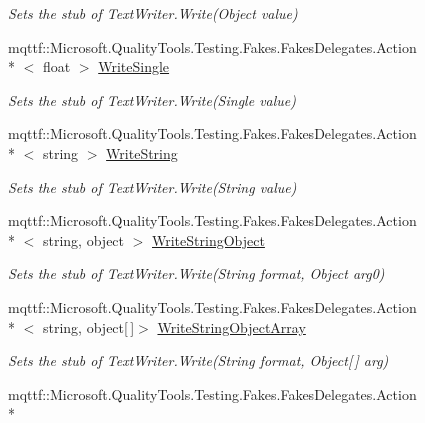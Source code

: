 \begin{DoxyCompactItemize}
\begin{DoxyCompactList}\small\item\em Sets the stub of Text\-Writer.\-Write(\-Object value)\end{DoxyCompactList}\item 
mqttf\-::\-Microsoft.\-Quality\-Tools.\-Testing.\-Fakes.\-Fakes\-Delegates.\-Action\\*
$<$ float $>$ \hyperlink{class_system_1_1_i_o_1_1_fakes_1_1_stub_text_writer_ace9f6f2aa0026e077d8958a6218b779f}{Write\-Single}
\begin{DoxyCompactList}\small\item\em Sets the stub of Text\-Writer.\-Write(\-Single value)\end{DoxyCompactList}\item 
mqttf\-::\-Microsoft.\-Quality\-Tools.\-Testing.\-Fakes.\-Fakes\-Delegates.\-Action\\*
$<$ string $>$ \hyperlink{class_system_1_1_i_o_1_1_fakes_1_1_stub_text_writer_af0a539ea1044339a1d185290aa32b513}{Write\-String}
\begin{DoxyCompactList}\small\item\em Sets the stub of Text\-Writer.\-Write(\-String value)\end{DoxyCompactList}\item 
mqttf\-::\-Microsoft.\-Quality\-Tools.\-Testing.\-Fakes.\-Fakes\-Delegates.\-Action\\*
$<$ string, object $>$ \hyperlink{class_system_1_1_i_o_1_1_fakes_1_1_stub_text_writer_aaff5f4694d123d2e888dd8357be116a7}{Write\-String\-Object}
\begin{DoxyCompactList}\small\item\em Sets the stub of Text\-Writer.\-Write(\-String format, Object arg0)\end{DoxyCompactList}\item 
mqttf\-::\-Microsoft.\-Quality\-Tools.\-Testing.\-Fakes.\-Fakes\-Delegates.\-Action\\*
$<$ string, object\mbox{[}$\,$\mbox{]}$>$ \hyperlink{class_system_1_1_i_o_1_1_fakes_1_1_stub_text_writer_a7beca0f2ec118191400925682b40b825}{Write\-String\-Object\-Array}
\begin{DoxyCompactList}\small\item\em Sets the stub of Text\-Writer.\-Write(\-String format, Object\mbox{[}$\,$\mbox{]} arg)\end{DoxyCompactList}\item 
mqttf\-::\-Microsoft.\-Quality\-Tools.\-Testing.\-Fakes.\-Fakes\-Delegates.\-Action\\*

\end{DoxyCompactItemize}
